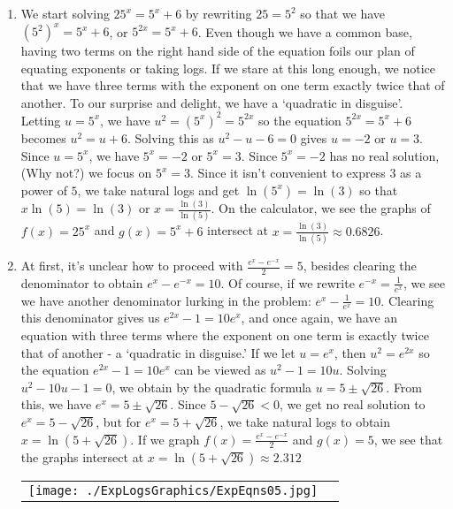 \begin{ex}
\begin{enumerate}
\item  We start solving $25^{x} = 5^{x} + 6$ by rewriting $25 = 5^2$ so that we have $\left(5^2\right)^{x} = 5^{x} + 6$, or $5^{2x} = 5^{x} + 6$.  Even though we have a common base, having two terms on the right hand side of the equation foils our plan of equating exponents or taking logs.  If we stare at this long enough, we notice that we have three terms with the exponent on one term exactly twice that of another. To our surprise and delight, we have a  `quadratic in disguise'.  Letting $u = 5^{x}$,  we have $u^2 = \left(5^{x}\right)^2 = 5^{2x}$ so the equation $5^{2x} = 5^{x} + 6$ becomes $u^2 = u + 6$.  Solving this as $u^2 - u - 6=0$ gives $u = -2$ or $u = 3$.  Since $u = 5^{x}$, we have $5^{x} = -2$ or $5^{x} = 3$.  Since $5^{x} = -2$ has no real solution, (Why not?) we focus on $5^{x} = 3$.  Since it isn't convenient to express $3$ as a power of $5$, we take natural logs and get $\ln\left(5^{x}\right) = \ln(3)$ so that $x \ln(5) = \ln(3)$ or $x = \frac{\ln(3)}{\ln(5)}$.  On the calculator, we see the graphs of $f(x) = 25^{x}$ and $g(x) = 5^{x} + 6$ intersect at $x=\frac{\ln(3)}{\ln(5)} \approx 0.6826$.

\item  At first, it's unclear how to proceed with $\frac{e^{x} - e^{-x}}{2} = 5$, besides clearing the denominator to obtain $e^{x} - e^{-x} = 10$.  Of course, if we rewrite $e^{-x} = \frac{1}{e^{x}}$, we see we have another denominator lurking in the problem:  $e^{x} - \frac{1}{e^{x}} = 10$. Clearing this denominator gives us $e^{2x} - 1 = 10e^{x}$, and once again, we have an equation with three terms where the exponent on one term is exactly twice that of another - a `quadratic in disguise.'  If we let $u = e^{x}$, then $u^2 = e^{2x}$ so the equation $e^{2x} - 1 = 10e^{x}$ can be viewed as $u^2-1 = 10u$.  Solving $u^2 - 10u - 1 = 0$, we obtain by the quadratic formula $u = 5 \pm \sqrt{26}$.  From this, we have $e^{x} = 5 \pm \sqrt{26}$.  Since $5 - \sqrt{26} < 0$, we get no real solution to $e^{x} = 5 - \sqrt{26}$, but for $e^{x} = 5 + \sqrt{26}$, we take natural logs to obtain $x = \ln\left(5 + \sqrt{26}\right)$.  If we graph $f(x) = \frac{e^{x} - e^{-x}}{2}$ and $g(x) = 5$, we see that the graphs intersect at $x = \ln\left(5 + \sqrt{26}\right) \approx 2.312$

\begin{center}

\begin{tabular}{cc}

\texttt{[image: ./ExpLogsGraphics/ExpEqns05.jpg]} &


\end{tabular}
\end{center}
\end{enumerate}
\end{ex}
